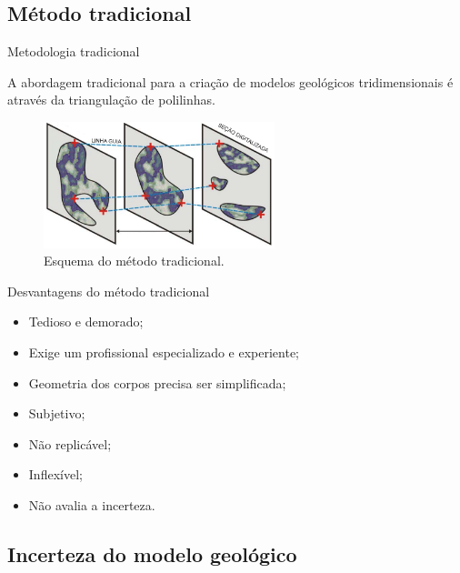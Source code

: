 \documentclass[aspectratio=169]{beamer}
\begin{document}
\subsection{Método tradicional}

\begin{frame}{Metodologia tradicional}

A abordagem tradicional para a criação de modelos geológicos tridimensionais é através da triangulação de polilinhas.

\begin{figure}[H]
	\begin{center}
		\includegraphics[width=0.6\textwidth]{capitulo_1/explicitmodeling}
		\caption{Esquema do método tradicional.}
	\end{center}
\end{figure}

\end{frame}

\begin{frame}{Desvantagens do método tradicional}
	\begin{itemize}
		\item Tedioso e demorado;
		\item Exige um profissional especializado e experiente;
		\item Geometria dos corpos precisa ser simplificada;
		\item Subjetivo;
		\item Não replicável;
		\item Inflexível;
		\item Não avalia a incerteza.
	\end{itemize}
\end{frame}

\subsection{Incerteza do modelo geológico}
\end{document}
